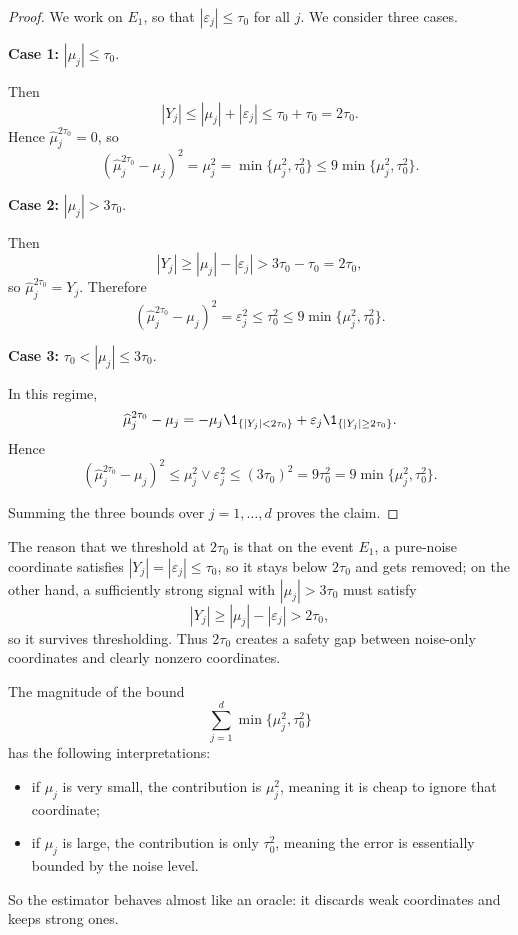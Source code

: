 \begin{proof}
We work on $E_1$, so that $|\varepsilon_j|\le \tau_0$ for all $j$. We consider three cases.

\medskip
\noindent
\textbf{Case 1:} $|\mu_j|\le \tau_0$.

Then
\[
|Y_j|
\le
|\mu_j|+|\varepsilon_j|
\le
\tau_0+\tau_0
=
2\tau_0.
\]
Hence $\widehat\mu^{2\tau_0}_j=0$, so
\[
(\widehat\mu^{2\tau_0}_j-\mu_j)^2
=
\mu_j^2
=
\min\{\mu_j^2,\tau_0^2\}
\le
9\min\{\mu_j^2,\tau_0^2\}.
\]

\medskip
\noindent
\textbf{Case 2:} $|\mu_j|>3\tau_0$.

Then
\[
|Y_j|
\ge
|\mu_j|-|\varepsilon_j|
>
3\tau_0-\tau_0
=
2\tau_0,
\]
so $\widehat\mu^{2\tau_0}_j=Y_j$. Therefore
\[
(\widehat\mu^{2\tau_0}_j-\mu_j)^2
=
\varepsilon_j^2
\le
\tau_0^2
\le
9\min\{\mu_j^2,\tau_0^2\}.
\]

\medskip
\noindent
\textbf{Case 3:} $\tau_0<|\mu_j|\le 3\tau_0$.

In this regime,
\[
\widehat\mu^{2\tau_0}_j-\mu_j
=
-\mu_j \1_{\{|Y_j|<2\tau_0\}}
+
\varepsilon_j \1_{\{|Y_j|\ge 2\tau_0\}}.
\]
Hence
\[
(\widehat\mu^{2\tau_0}_j-\mu_j)^2
\le
\mu_j^2 \vee \varepsilon_j^2
\le
(3\tau_0)^2
=
9\tau_0^2
=
9\min\{\mu_j^2,\tau_0^2\}.
\]

Summing the three bounds over $j=1,\dots,d$ proves the claim.
\end{proof}

\begin{remark}
The reason that we threshold at $2\tau_0$ is that on the event $E_1$, a pure-noise coordinate satisfies $|Y_j|=|\varepsilon_j|\le \tau_0$, so it stays below $2\tau_0$ and gets removed; on the other hand, a sufficiently strong signal with $|\mu_j|>3\tau_0$ must satisfy
\[
|Y_j|\ge |\mu_j|-|\varepsilon_j|>2\tau_0,
\]
so it survives thresholding. Thus $2\tau_0$ creates a safety gap between noise-only coordinates and clearly nonzero coordinates.
\end{remark}

\begin{remark}
The magnitude of the bound
\[
\sum_{j=1}^d \min\{\mu_j^2,\tau_0^2\}
\]
has the following interpretations:
\begin{itemize}
    \item if $\mu_j$ is very small, the contribution is $\mu_j^2$, meaning it is cheap to ignore that coordinate;
    \item if $\mu_j$ is large, the contribution is only $\tau_0^2$, meaning the error is essentially bounded by the noise level.
\end{itemize}
So the estimator behaves almost like an oracle: it discards weak coordinates and keeps strong ones.
\end{remark}

